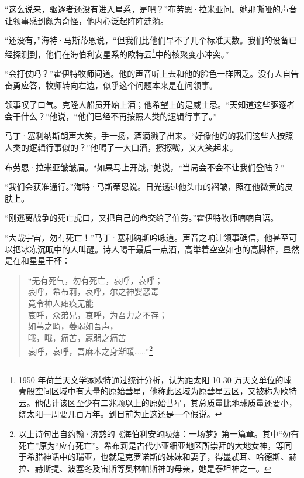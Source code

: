 \documentclass[AutoFakeBold=true]{book}
\begin{document}
\vspace*{1em}

``这么说来，驱逐者还没有进入星系，是吧？''布劳恩·拉米亚问。她那嘶哑的声音让领事感到颇为奇怪，他内心泛起阵阵涟漪。

``还没有，''海特·马斯蒂恩说，``但我们比他们早不了几个标准天数。我们的设备已经探测到，他们在海伯利安星系的欧特云\footnote{1950 年荷兰天文学家欧特通过统计分析，认为距太阳 10-30 万天文单位的球壳般空间区域中有大量的原始彗星，他称此区域为原彗星云区，又被称为欧特云。他估计该区至少有二兆颗以上的原始彗星，其总质量比地球质量还要小，绕太阳一周要几百万年。到目前为止这还是一个假说。}中的核聚变小冲突。''

``会打仗吗？''霍伊特牧师问道。他的声音听上去和他的脸色一样困乏。没有人自告奋勇应答，牧师转向右边，似乎这个问题本来是在问领事。

领事叹了口气。克隆人船员开始上酒；他希望上的是威士忌。``天知道这些驱逐者会干什么？''他说，``他们已经不再按照人类的逻辑行事了。''

马丁·塞利纳斯朗声大笑，手一扬，酒滴溅了出来。``好像他妈的我们这些人按照人类的逻辑行事似的？''他喝了一大口酒，擦擦嘴，又大笑起来。

布劳恩·拉米亚皱皱眉。``如果马上开战，''她说，``当局会不会不让我们登陆？''

``我们会获准通行。''海特·马斯蒂恩说。日光透过他头巾的褶皱，照在他微黄的皮肤上。

``刚逃离战争的死亡虎口，又把自己的命交给了伯劳。''霍伊特牧师喃喃自语。

``大哉宇宙，勿有死亡！''马丁·塞利纳斯吟咏道。声音之响让领事确信，他甚至可以把冰冻沉眠中的人叫醒。诗人喝干最后一点酒，高举着空空如也的高脚杯，显然是在和星星干杯：

\begin{quote}
	{\kaishu ``无有死气，勿有死亡，哀呼，哀呼；\\
	哀呼，希布莉，哀呼，尔之神婴恶毒\\
	竟令神人瘫痪无能\\
	哀呼，众弟兄，哀呼，为吾力之不存；\\
	如苇之畸，萎弱如吾声，\\
	哦，哦，痛苦，羸弱之痛苦\\
	哀呼，哀呼，吾麻木之身渐暖……''}\footnote{以上诗句出自约翰·济慈的《海伯利安的陨落：一场梦》第一篇章。其中``勿有死亡''原为``应有死亡''。希布莉是古代小亚细亚地区所崇拜的大地女神，等同于希腊神话中的瑞亚，也就是克罗诺斯的妹妹和妻子，得墨忒耳、哈德斯、赫拉、赫斯提、波塞冬及宙斯等奥林帕斯神的母亲，她是泰坦神之一。}
\end{quote}
\end{document}
